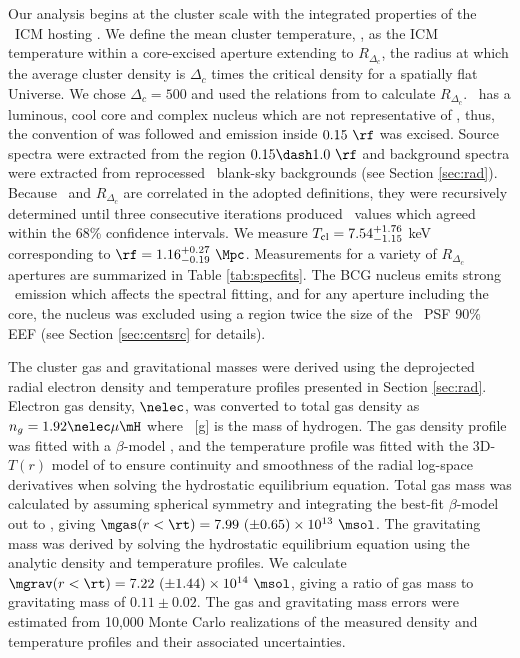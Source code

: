\documentclass[useAMS,usenatbib]{mn2e}
\begin{document}
Our analysis begins at the cluster scale with the integrated
properties of the \rxj\ ICM hosting \irs. We define the mean cluster
temperature, \cltx, as the ICM temperature within a core-excised
aperture extending to $R_{\Delta_c}$, the radius at which the average
cluster density is $\Delta_c$ times the critical density for a
spatially flat Universe. We chose $\Delta_c = 500$ and used the
relations from \cite{2002A&A...389....1A} to calculate
$R_{\Delta_c}$. \rxj\ has a luminous, cool core and complex nucleus
which are not representative of \cltx, thus, the convention of
\citet{2007ApJ...668..772M} was followed and emission inside $0.15
~\rf$ was excised. Source spectra were extracted from the region $0.15
\dash 1.0~\rf$ and background spectra were extracted from reprocessed
\caldb\ blank-sky backgrounds (see Section \ref{sec:rad}). Because
\cltx\ and $R_{\Delta_c}$ are correlated in the adopted definitions,
they were recursively determined until three consecutive iterations
produced \cltx\ values which agreed within the 68\% confidence
intervals. We measure $T_{\mathrm{cl}} = 7.54^{+1.76}_{-1.15}$ keV corresponding
to $\rf = 1.16^{+0.27}_{-0.19}~\Mpc$. Measurements for a variety of
$R_{\Delta_c}$ apertures are summarized in Table \ref{tab:specfits}.
The BCG nucleus emits strong \feka\ emission which affects the
spectral fitting, and for any aperture including the core, the nucleus
was excluded using a region twice the size of the \chandra\ PSF 90\%
EEF (see Section \ref{sec:centsrc} for details).

The cluster gas and gravitational masses were derived using the
deprojected radial electron density and temperature profiles presented
in Section \ref{sec:rad}. Electron gas density, $\nelec$, was
converted to total gas density as $n_g = 1.92 \nelec \mu \mH$ where
\mH\ [g] is the mass of hydrogen. The gas density profile was fitted
with a $\beta$-model \citep{betamodel}, and the temperature profile
was fitted with the 3D-$T(r)$ model of \citet{2006ApJ...640..691V} to
ensure continuity and smoothness of the radial log-space derivatives
when solving the hydrostatic equilibrium equation. Total gas mass was
calculated by assuming spherical symmetry and integrating the best-fit
$\beta$-model out to \rt, giving $\mgas(r<\rt) = 7.99 ~(\pm 0.65)
\times 10^{13} ~\msol$. The gravitating mass was derived by solving
the hydrostatic equilibrium equation using the analytic density and
temperature profiles. We calculate $\mgrav(r<\rt) = 7.22 ~(\pm 1.44)
\times 10^{14} ~\msol$, giving a ratio of gas mass to gravitating mass
of $0.11 \pm 0.02$. The gas and gravitating mass errors were estimated
from 10,000 Monte Carlo realizations of the measured density and
temperature profiles and their associated uncertainties.
\end{document}
